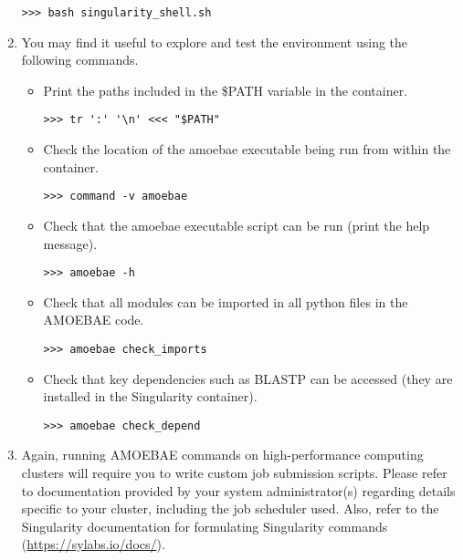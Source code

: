 \documentclass[12pt,letterpaper]{article}
\begin{document}
\begin{linenumbers}
\begin{enumerate}
\begin{lstlisting}
>>> bash singularity_shell.sh
\end{lstlisting}

\item You may find it useful to explore and test the environment using the
    following commands.

\begin{itemize}

\item Print the paths included in the \$PATH variable in the container.
\begin{lstlisting}
>>> tr ':' '\n' <<< "$PATH"
\end{lstlisting}

\item Check the location of the amoebae executable being run from within
    the container.
\begin{lstlisting}
>>> command -v amoebae
\end{lstlisting}

\item Check that the amoebae executable script can be run (print the help
    message).
\begin{lstlisting}
>>> amoebae -h
\end{lstlisting}

\item Check that all modules can be imported in all python files in the
    AMOEBAE code.
\begin{lstlisting}
>>> amoebae check_imports
\end{lstlisting}

\item Check that key dependencies such as BLASTP can be accessed (they are
    installed in the Singularity container).
\begin{lstlisting}
>>> amoebae check_depend
\end{lstlisting}

\end{itemize}

\item Again, running AMOEBAE commands on high-performance computing clusters
    will require you to write custom job submission scripts. Please refer to
        documentation provided by your system administrator(s) regarding
        details specific to your cluster, including the job scheduler used.
        Also, refer to the Singularity documentation for formulating
        Singularity commands (\url{https://sylabs.io/docs/}).


\end{enumerate}
\end{linenumbers}
\end{document}
